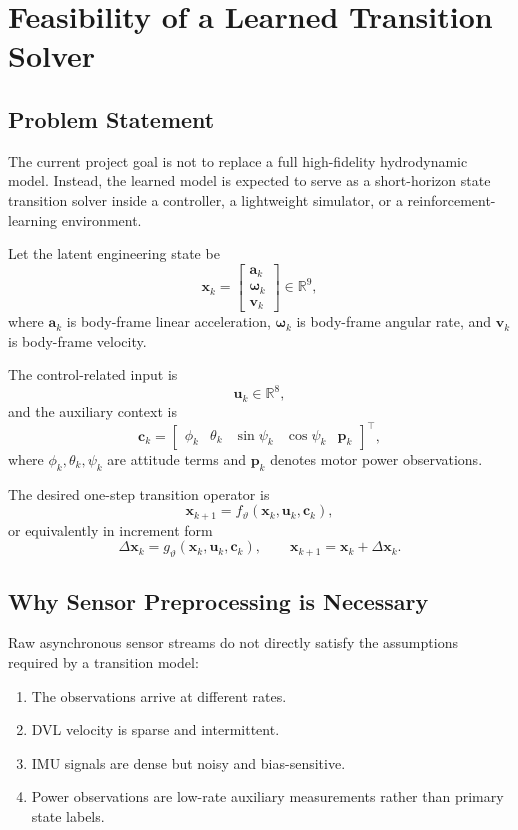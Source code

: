 \section{Feasibility of a Learned Transition Solver}

\subsection{Problem Statement}

The current project goal is not to replace a full high-fidelity hydrodynamic model.
Instead, the learned model is expected to serve as a short-horizon state transition solver
inside a controller, a lightweight simulator, or a reinforcement-learning environment.

Let the latent engineering state be
\[
\mathbf{x}_k =
\begin{bmatrix}
\mathbf{a}_k \\
\boldsymbol{\omega}_k \\
\mathbf{v}_k
\end{bmatrix}
\in \mathbb{R}^{9},
\]
where $\mathbf{a}_k$ is body-frame linear acceleration,
$\boldsymbol{\omega}_k$ is body-frame angular rate,
and $\mathbf{v}_k$ is body-frame velocity.

The control-related input is
\[
\mathbf{u}_k \in \mathbb{R}^{8},
\]
and the auxiliary context is
\[
\mathbf{c}_k =
\begin{bmatrix}
\phi_k & \theta_k & \sin\psi_k & \cos\psi_k & \mathbf{p}_k
\end{bmatrix}^{\top},
\]
where $\phi_k,\theta_k,\psi_k$ are attitude terms and $\mathbf{p}_k$ denotes motor power observations.

The desired one-step transition operator is
\[
\mathbf{x}_{k+1} = f_{\vartheta}(\mathbf{x}_k, \mathbf{u}_k, \mathbf{c}_k),
\]
or equivalently in increment form
\[
\Delta \mathbf{x}_k = g_{\vartheta}(\mathbf{x}_k, \mathbf{u}_k, \mathbf{c}_k),
\qquad
\mathbf{x}_{k+1} = \mathbf{x}_k + \Delta \mathbf{x}_k.
\]

\subsection{Why Sensor Preprocessing is Necessary}

Raw asynchronous sensor streams do not directly satisfy the assumptions required by a transition model:

\begin{enumerate}
\item The observations arrive at different rates.
\item DVL velocity is sparse and intermittent.
\item IMU signals are dense but noisy and bias-sensitive.
\item Power observations are low-rate auxiliary measurements rather than primary state labels.
\end{enumerate}

